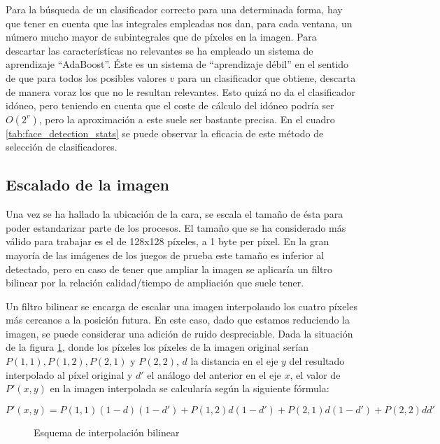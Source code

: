Para la búsqueda de un clasificador correcto para una determinada forma, hay que tener en cuenta que las integrales empleadas nos dan, para cada ventana, un número mucho mayor de subintegrales que de píxeles en la imagen. Para descartar las características no relevantes se ha empleado un sistema de aprendizaje ``AdaBoost''. Éste es un sistema de ``aprendizaje débil'' en el sentido de que para todos los posibles valores $v$ para un clasificador que obtiene, descarta de manera voraz los que no le resultan relevantes. Esto quizá no da el clasificador idóneo, pero teniendo en cuenta que el coste de cálculo del idóneo podría ser $O(2^{v})$, pero la aproximación a este suele ser bastante precisa. En el cuadro \ref{tab:face_detection_stats} se puede observar la eficacia de este método de selección de clasificadores.

\subsection{Escalado de la imagen}
Una vez se ha hallado la ubicación de la cara, se escala el tamaño de ésta para poder estandarizar parte de los procesos. El tamaño que se ha considerado más válido para trabajar es el de 128x128 píxeles, a 1 byte per píxel. En la gran mayoría de las imágenes de los juegos de prueba este tamaño es inferior al detectado, pero en caso de tener que ampliar la imagen se aplicaría un filtro bilinear por la relación calidad/tiempo de ampliación que suele tener.

Un filtro bilinear se encarga de escalar una imagen interpolando los cuatro píxeles más cercanos a la posición futura. En este caso, dado que estamos reduciendo la imagen, se puede considerar una adición de ruido despreciable. Dada la situación de la figura \ref{fig:interp_bilinear}, donde los píxeles los píxeles de la imagen original serían $P(1,1), P(1,2), P(2,1)$ y $P(2,2)$, $d$ la distancia en el eje $y$ del resultado interpolado al píxel original y $d'$ el análogo del anterior en el eje $x$, el valor de $P'(x,y)$ en la imagen interpolada se calcularía según la siguiente fórmula:

\[ P'(x,y) = P(1,1) (1-d) (1-d')+ P(1,2) d (1-d') + P(2,1) d (1-d') + P(2,2) d d'
\]

\begin{figure}[h!]
        \centering
        
        \caption{Esquema de interpolación bilinear}
	\label{fig:interp_bilinear}
\end{figure}

